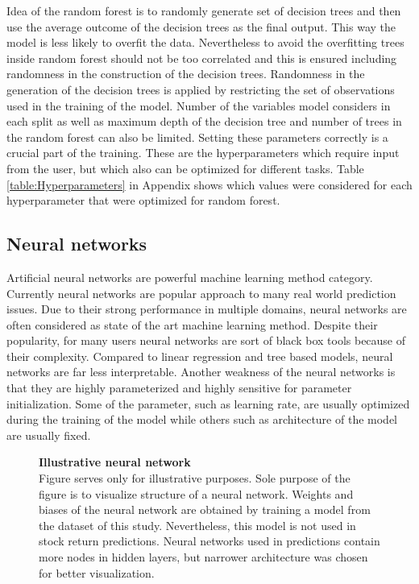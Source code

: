 \documentclass{article}
\begin{document}
Idea of the random forest is to randomly generate set of decision trees and then use the average outcome of the decision trees as the final output. This way the model is less likely to overfit the data. Nevertheless to avoid the overfitting trees inside random forest should not be too correlated and this is ensured including randomness in the construction of the decision trees. Randomness in the generation of the decision trees is applied by restricting the set of observations used in the training of the model. Number of the variables model considers in each split as well as maximum depth of the decision tree and number of trees in the random forest can also be limited. Setting these parameters correctly is a crucial part of the training. These are the hyperparameters which require input from the user, but which also can be optimized for different tasks. Table \ref{table:Hyperparameters} in Appendix shows which values were considered for each hyperparameter that were optimized for random forest. \par

\subsection{Neural networks}

Artificial neural networks are powerful machine learning method category. Currently neural networks are popular approach to many real world prediction issues. Due to their strong performance in multiple domains, neural networks are often considered as state of the art machine learning method. Despite their popularity, for many users neural networks are sort of black box tools because of their complexity. Compared to linear regression and tree based models, neural networks are far less interpretable. Another weakness of the neural networks is that they are highly parameterized and highly sensitive for parameter initialization. Some of the parameter, such as learning rate, are usually optimized during the training of the model while others such as architecture of the model are usually fixed.  \par

\begin{figure}[ht]
\centering
\caption[Illustrative neural network]{\textbf{Illustrative neural network}\\  Figure serves only for illustrative purposes. Sole purpose of the figure is to visualize structure of a neural network. Weights and biases of the neural network are obtained by training a model from the dataset of this study. Nevertheless, this model is not used in stock return predictions. Neural networks used in predictions contain more nodes in hidden layers, but narrower architecture was chosen for better visualization.}

\label{plot:NN}
\end{figure}
\end{document}
